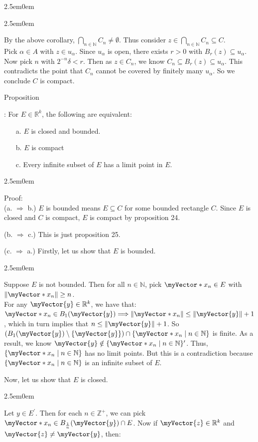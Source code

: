 \documentclass{book}
\newcommand{\hThree}{%
   \color{PineGreen}
   \fontsize{13}{15}\selectfont%
}
\newcommand{\hFour}{%
   \color{Cerulean}
   \fontsize{12}{14}\selectfont%
}
\newenvironment{myIndent}{%
   \begin{adjustwidth}{2.5em}{0em}%
}{%
   \end{adjustwidth}%
}
\newcommand{\retTwo}{\hfill\bigbreak}
\newcounter{PropNumber}
\newcommand{\propCount}[1][1]{%
   \addtocounter{PropNumber}{#1}%
   \thePropNumber%
}
\newcommand{\mVec}[1]{\myVector{#1}}
\newcommand{\mVecAst}[1]{\myVector*{#1}}
\begin{document}
{\begin{myIndent}
\begin{myIndent}
{{{            %
         }} \retTwo\par}

         By the above corollary, ${\displaystyle \bigcap_{n\in\mathbb{N}}{C_n} \neq \emptyset}$. Thus consider $z \in {\displaystyle \bigcap_{n\in\mathbb{N}}{C_n}} \subseteq C$. \\
         Pick $\alpha \in A$ with $z \in u_\alpha$. Since $u_\alpha$ is open, there exists $r > 0$ with $B_r(z) \subseteq u_\alpha$. Now pick $n$ with $2^{-n}\delta < r$. Then as $z \in C_n$, we know $C_n \subseteq B_r(z) \subseteq u_\alpha$. This contradicts the point that $C_n$ cannot be covered by finitely many $u_\alpha$. \retTwo
         So we conclude $C$ is compact. \retTwo
      \end{myIndent}

      \newpage

      Proposition \propCount: For $E \in \mathbb{R}^k$, the following are equivalent:
      \begin{enumerate}
         \item[a.] $E$ is closed and bounded.
         \item[b.] $E$ is compact
         \item[c.] Every infinite subset of $E$ has a limit point in $E$.
      \end{enumerate}

      {\begin{myIndent} \hThree
         Proof: \\
         (a. $\Longrightarrow$ b.) $E$ is bounded means $E \subseteq C$ for some bounded rectangle $C$. Since $E$ is closed and $C$ is compact, $E$ is compact by proposition 24. \retTwo

         (b. $\Longrightarrow$ c.) This is just proposition 25. \retTwo

         (c. $\Longrightarrow$ a.) Firstly, let us show that $E$ is bounded.
         {\begin{myIndent} \hFour
            Suppose $E$ is not bounded. Then for all $n \in \mathbb{N}$, pick $\mVecAst{x}_n \in E$ with $\|\mVecAst{x}_n\|\geq n$.\\
            For any $\mVec{y} \in \mathbb{R}^k$, we have that: $\mVecAst{x}_n \in B_1(\mVec{y}) \Longrightarrow \|\mVecAst{x}_n\| \leq \|\mVec{y}\| + 1$, which in turn implies that $n \leq \|\mVec{y}\| + 1$. So $(B_1(\mVec{y}) \setminus \{\mVec{y}\}) \cap \{\mVecAst{x}_n \mid n \in \mathbb{N}\}$ is finite. As a result, we know $\mVec{y} \notin \{\mVecAst{x}_n \mid n \in \mathbb{N}\}^\prime$. Thus, $\{\mVecAst{x}_n \mid n \in \mathbb{N}\}$ has no limit points. But this is a contradiction because $\{\mVecAst{x}_n \mid n \in \mathbb{N}\}$ is an infinite subset of $E$. \retTwo
         \end{myIndent}}
         Now, let us show that $E$ is closed.
         {\begin{myIndent} \hFour
            Let $y \in E^\prime$. Then for each $n \in \mathbb{Z}^+$, we can pick $\mVecAst{x}_n \in B_{\frac{1}{n}}(\mVec{y}) \cap E$. Now if $\mVec{z} \in \mathbb{R}^k$ and $\mVec{z} \neq \mVec{y}$, then: \retTwo
            

\end{myIndent}}
\end{myIndent}}
\end{myIndent}}
\end{document}
